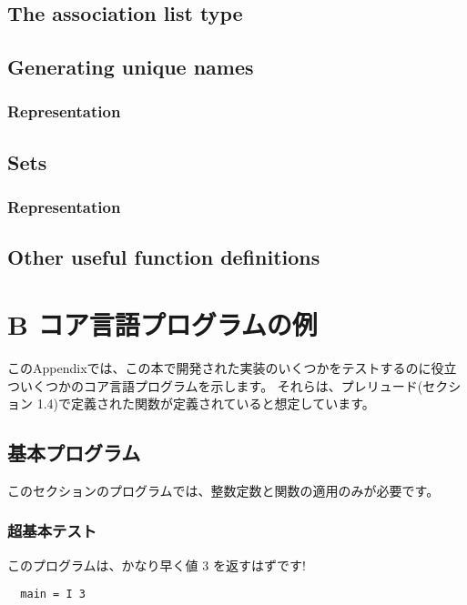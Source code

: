 \documentclass{jarticle}
\begin{document}
\subsection{The association list type}

\subsection{Generating unique names}
\subsubsection{Representation}
\newpage

\subsection{Sets}
\subsubsection{Representation}
\newpage

\subsection{Other useful function definitions}
\newpage

\section{B コア言語プログラムの例}

このAppendixでは、この本で開発された実装のいくつかをテストするのに役立ついくつかのコア言語プログラムを示します。
それらは、プレリュード(セクション 1.4)で定義された関数が定義されていると想定しています。

\subsection{基本プログラム}

このセクションのプログラムでは、整数定数と関数の適用のみが必要です。

\subsubsection{超基本テスト}

このプログラムは、かなり早く値 3 を返すはずです!

\begin{verbatim}
  main = I 3
\end{verbatim}
\end{document}
